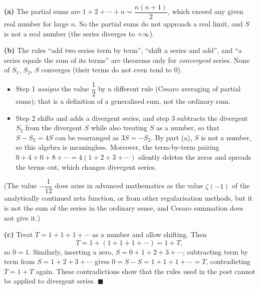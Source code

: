 \textbf{(a)} The partial sums are \(1+2+\cdots+n=\dfrac{n(n+1)}{2}\), which exceed any given real number for large \(n\). So the partial sums do not approach a real limit, and \(S\) is not a real number (the series diverges to \(+\infty\)).

\textbf{(b)} The rules ``add two series term by term'', ``shift a series and add'', and ``a series equals the sum of its terms'' are theorems only for \emph{convergent} series. None of \(S_1\), \(S_2\), \(S\) converges (their terms do not even tend to \(0\)).
\begin{itemize}
\item Step 1 \emph{assigns} the value \(\dfrac{1}{2}\) by a different rule (Cesaro averaging of partial sums); that is a definition of a generalised sum, not the ordinary sum.
\item Step 2 shifts and adds a divergent series, and step 3 subtracts the divergent \(S_2\) from the divergent \(S\) while also treating \(S\) as a number, so that \(S-S_2=4S\) can be rearranged as \(3S=-S_2\). By part (a), \(S\) is not a number, so this algebra is meaningless. Moreover, the term-by-term pairing \(0+4+0+8+\cdots=4(1+2+3+\cdots)\) silently deletes the zeros and spreads the terms out, which changes divergent series.
\end{itemize}
(The value \(-\dfrac{1}{12}\) does arise in advanced mathematics as the value \(\zeta(-1)\) of the analytically continued zeta function, or from other regularisation methods, but it is not the sum of the series in the ordinary sense, and Cesaro summation does not give it.)

\textbf{(c)} Treat \(T=1+1+1+\cdots\) as a number and allow shifting. Then
\[
T=1+(1+1+1+\cdots)=1+T,
\]
so \(0=1\). Similarly, inserting a zero, \(S=0+1+2+3+\cdots\); subtracting term by term from \(S=1+2+3+\cdots\) gives \(0=S-S=1+1+1+\cdots=T\), contradicting \(T=1+T\) again. These contradictions show that the rules used in the post cannot be applied to divergent series. \(\blacksquare\)
